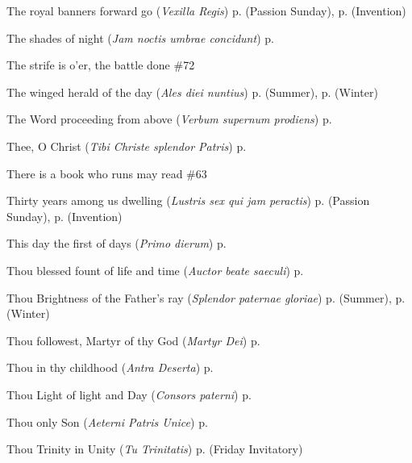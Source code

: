 \begin{hangparas}{1.25em}{1}
\par\noindent
The royal banners forward go (\textit{Vexilla Regis}) \dotfill p. \pageref{PassionSundayEvensong} (Passion Sunday), p. \pageref{InventionEvensong} (Invention)
\par\noindent
The shades of night (\textit{Jam noctis umbrae concidunt}) \dotfill p. \pageref{ScholasticaMattins}
\par\noindent
The strife is o'er, the battle done \dotfill \#72
\par\noindent
The winged herald of the day (\textit{Ales diei nuntius}) \dotfill p. \pageref{TuesdayMattinsSummer} (Summer), p. \pageref{TuesdayMattinsWinter} (Winter)
\par\noindent
The Word proceeding from above (\textit{Verbum supernum prodiens}) \dotfill p. \pageref{CorpusChristiMattins}
\par\noindent
Thee, O Christ (\textit{Tibi Christe splendor Patris}) \dotfill p. \pageref{MichaelEvensong}
\par\noindent
There is a book who runs may read \dotfill \#63
\par\noindent
Thirty years among us dwelling (\textit{Lustris sex qui jam peractis}) \dotfill p. \pageref{PassionSundayMattins} (Passion Sunday), p. \pageref{InventionMattins} (Invention)
\par\noindent
This day the first of days (\textit{Primo dierum}) \dotfill p. \pageref{SundayInvitatoryWinter}
\par\noindent
Thou blessed fount of life and time (\textit{Auctor beate saeculi}) \dotfill p. \pageref{CompassionEvensong}
\par\noindent
Thou Brightness of the Father's ray (\textit{Splendor paternae gloriae}) \dotfill p. \pageref{MondayMattinsSummer} (Summer), p. \pageref{MondayMattinsWinter} (Winter)
\par\noindent
Thou followest, Martyr of thy God (\textit{Martyr Dei}) \dotfill p. \pageref{StephenMattins}
\par\noindent
Thou in thy childhood (\textit{Antra Deserta}) \dotfill p. \pageref{JohnBaptistInvitatory}
\par\noindent
Thou Light of light and Day (\textit{Consors paterni}) \dotfill p. \pageref{TuesdayInvitatory}
\par\noindent
Thou only Son (\textit{Aeterni Patris Unice}) \dotfill p. \pageref{MaryMagdaleneMattins}
\par\noindent
Thou Trinity in Unity (\textit{Tu Trinitatis}) \dotfill p. \pageref{FridayInvitatory} (Friday Invitatory)
\par\noindent

\end{hangparas}

